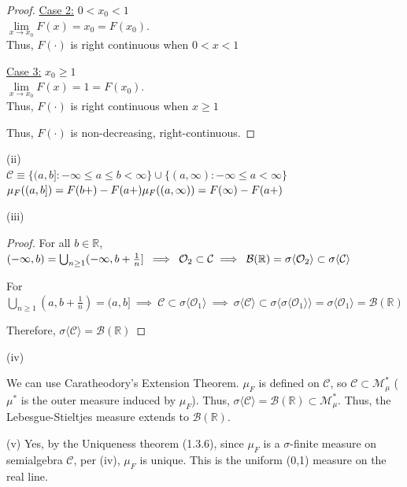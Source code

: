 \documentclass[12pt,letterpaper, onecolumn]{exam}
\newcommand{\real}{\mathbb{R}}
\newcommand{\calO}{\mathcal{O}}
\newcommand{\calC}{\mathcal{C}}
\newcommand{\calB}{\mathcal{B}}
\newcommand{\gensig}[1]{\sigma\langle #1 \rangle} %
\newcommand{\om}{\mu^*} %
\begin{document}
\begin{questions}
\begin{solution}
\begin{proof}
        \underline{Case 2:} $0 < x_0 < 1$ \\
        $\lim\limits_{x \to x_0} F(x) = x_0 = F(x_0)$. \\
        Thus, $F(\cdot)$ is right continuous when $0 < x < 1$

        \underline{Case 3:} $x_0 \geq 1$ \\
        $\lim\limits_{x \to x_0} F(x) = 1 = F(x_0)$. \\
        Thus, $F(\cdot)$ is right continuous when $ x \geq 1$

        Thus, $F(\cdot)$ is non-decreasing, right-continuous. 
    \end{proof}

    (ii) \\
    $\calC \equiv \{(a, b]: -\infty \leq a \leq b < \infty \} \cup \{(a, \infty): -\infty \leq a < \infty\}$ \\
    $\mu_F((a, b]) = F(b+) - F(a+) \\ \mu_F((a, \infty)) = F(\infty) - F(a+)$

    (iii) 
    \begin{proof}
    For all $b \in \real$, $(-\infty, b) = \bigcup_{n \geq 1} (-\infty, b + \tfrac{1}{n}] \: \implies \: \calO_2 \subset \calC \\ \implies \: \calB(\real) = \gensig{\calO_2} \subset \gensig{\calC}$

    For $\bigcup_{n \geq 1} (a, b + \tfrac{1}{n}) = (a, b] \: \implies \: \calC \subset \gensig{\calO_1} \: \implies \: \gensig{\calC} \subset \gensig{\gensig{\calO_1}} = \gensig{\calO_1} = \calB(\real)$

    Therefore, $\gensig{\calC} = \calB(\real)$
    \end{proof}

    (iv)

    We can use Caratheodory's Extension Theorem. $\mu_F$ is defined on $\calC$, so $\calC \subset \mathcal{M}_\om$ ($\om$ is the outer measure induced by $\mu_F$). Thus, $\gensig{\calC} = \calB(\real) \subset \mathcal{M}_\om$. Thus, the Lebesgue-Stieltjes measure extends to $\calB(\real)$.

    (v) Yes, by the Uniqueness theorem (1.3.6), since $\mu_F$ is a $\sigma$-finite measure on semialgebra $\calC$, per (iv), $\mu_F$ is unique. This is the uniform (0,1) measure on the real line.  

    \end{solution}

\end{questions}
\end{document}
